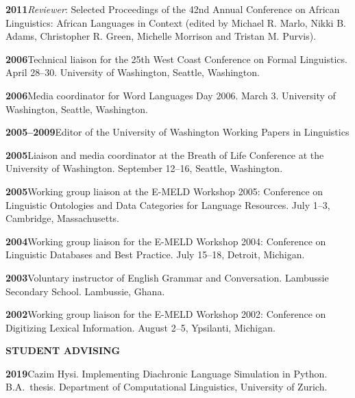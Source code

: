 \documentclass[11pt]{article}
\newcommand{\hangpara}{
 \setlength{\parindent}{0in} %
 \hangindent=0.42in %
}
\begin{document}
\vskip 6pt
\hangpara
{\bf 2011}\hspace{1ex}\textit{Reviewer}: Selected Proceedings of the 42nd Annual Conference on African Linguistics: African Languages in Context (edited by Michael R. Marlo, Nikki B. Adams, Christopher R. Green, Michelle Morrison and Tristan M. Purvis).

\vskip 6pt
\hangpara
{\bf 2006}\hspace{1ex}Technical liaison for the 25th West Coast Conference on Formal Linguistics. April 28--30. University of Washington, Seattle, Washington.

\vskip 6pt
\hangpara
{\bf 2006}\hspace{1ex}Media coordinator for Word Languages Day 2006. March 3. University of Washington, Seattle, Washington.	

\vskip 6pt
\hangpara
{\bf 2005--2009}\hspace{1ex}Editor of the University of Washington Working Papers in Linguistics

\vskip 6pt
\hangpara
{\bf 2005}\hspace{1ex}Liaison and media coordinator at the Breath of Life Conference at the University of Washington. September 12--16, Seattle, Washington.

\vskip 6pt
\hangpara
{\bf 2005}\hspace{1ex}Working group liaison at the E-MELD Workshop 2005: Conference on Linguistic Ontologies and Data Categories for Language Resources. July 1--3, Cambridge, Massachusetts.

\vskip 6pt
\hangpara
{\bf 2004}\hspace{1ex}Working group liaison for the E-MELD Workshop 2004: Conference on Linguistic Databases and Best Practice. July 15--18, Detroit, Michigan.

\vskip 6pt
\hangpara
{\bf 2003}\hspace{1ex}Voluntary instructor of English Grammar and Conversation. Lambussie Secondary School. Lambussie, Ghana.

\vskip 6pt
\hangpara
{\bf 2002}\hspace{1ex}Working group liaison for the E-MELD Workshop 2002: Conference on Digitizing Lexical Information. August 2--5, Ypsilanti, Michigan.

\vskip 20pt
\begin{flushleft}
{\bf STUDENT ADVISING}
\end{flushleft}

\hangpara
{\bf 2019}\hspace{1ex}Cazim Hysi. Implementing Diachronic Language Simulation in Python. B.A.\ thesis. Department of Computational Linguistics, University of Zurich.
\end{document}
